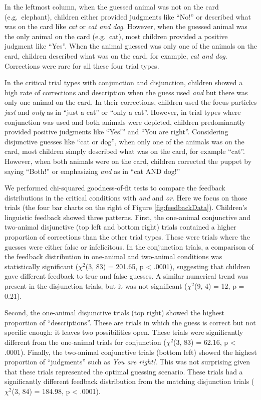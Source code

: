 \documentclass[floatsintext,man]{apa6}
\theoremstyle{definition}
\theoremstyle{definition}
\theoremstyle{definition}
\theoremstyle{remark}
\begin{document}
In the leftmost column, when the guessed animal was not on the card
(e.g.~elephant), children either provided judgments like \enquote{No!}
or described what was on the card like \emph{cat} or \emph{cat and dog}.
However, when the guessed animal was the only animal on the card
(e.g.~cat), most children provided a positive judgment like
\enquote{Yes}. When the animal guessed was only one of the animals on
the card, children described what was on the card, for example,
\emph{cat and dog}. Corrections were rare for all these four trial
types.

In the critical trial types with conjunction and disjunction, children
showed a high rate of corrections and description when the guess used
\emph{and} but there was only one animal on the card. In their
corrections, children used the focus particles \emph{just} and
\emph{only} as in \enquote{just a cat} or \enquote{only a cat}. However,
in trial types where conjunction was used and both animals were
depicted, children predominantly provided positive judgments like
\enquote{Yes!} and \enquote{You are right}. Considering disjunctive
guesses like \enquote{cat or dog}, when only one of the animals was on
the card, most children simply described what was on the card, for
example \enquote{cat}. However, when both animals were on the card,
children corrected the puppet by saying \enquote{Both!} or emphasizing
\emph{and} as in \enquote{cat AND dog!}

We performed chi-squared goodness-of-fit tests to compare the feedback
distributions in the critical conditions with \emph{and} and \emph{or}.
Here we focus on those trials (the four bar charts on the right of
Figure \ref{fig:feedbackData}). Children's linguistic feedback showed
three patterns. First, the one-animal conjunctive and two-animal
disjunctive (top left and bottom right) trials contained a higher
proportion of corrections than the other trial types. These were trials
where the guesses were either false or infelicitous. In the conjunction
trials, a comparison of the feedback distribution in one-animal and
two-animal conditions was statistically significant (\(\chi^2\)(3, 83) =
201.65, p \textless{} .0001), suggesting that children gave different
feedback to true and false guesses. A similar numerical trend was
present in the disjunction trials, but it was not significant
(\(\chi^2\)(9, 4) = 12, p = 0.21).

Second, the one-animal disjunctive trials (top right) showed the highest
proportion of \enquote{descriptions}. These are trials in which the
guess is correct but not specific enough: it leaves two possibilities
open. These trials were significantly different from the one-animal
trials for conjunction (\(\chi^2\)(3, 83) = 62.16, p \textless{} .0001).
Finally, the two-animal conjunctive trials (bottom left) showed the
highest proportion of \enquote{judgments} such as \emph{You are right!}.
This was not surprising given that these trials represented the optimal
guessing scenario. These trials had a significantly different feedback
distribution from the matching disjunction trials (\(\chi^2\)(3, 84) =
184.98, p \textless{} .0001).
\end{document}
